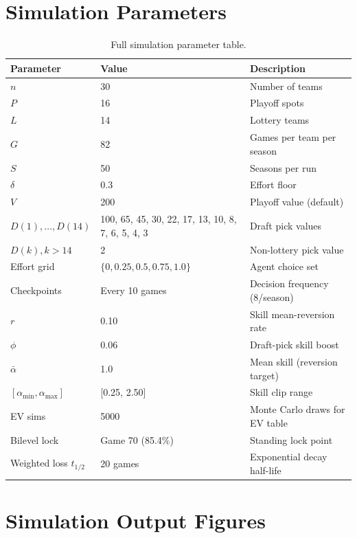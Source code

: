 \documentclass{article}
\begin{document}
\section{Simulation Parameters}
\label{app:params}

\begin{table}[h]
\centering
\renewcommand{\arraystretch}{1.25}
\begin{tabular}{lll}
\toprule
\textbf{Parameter} & \textbf{Value} & \textbf{Description} \\
\midrule
$n$ & 30 & Number of teams \\
$P$ & 16 & Playoff spots \\
$L$ & 14 & Lottery teams \\
$G$ & 82 & Games per team per season \\
$S$ & 50 & Seasons per run \\
$\delta$ & 0.3 & Effort floor \\
$V$ & 200 & Playoff value (default) \\
$D(1),\ldots,D(14)$ & 100, 65, 45, 30, 22, 17, 13, 10, 8, 7, 6, 5, 4, 3
    & Draft pick values \\
$D(k), k > 14$ & 2 & Non-lottery pick value \\
Effort grid & $\{0, 0.25, 0.5, 0.75, 1.0\}$ & Agent choice set \\
Checkpoints & Every 10 games & Decision frequency (8/season) \\
$r$ & 0.10 & Skill mean-reversion rate \\
$\phi$ & 0.06 & Draft-pick skill boost \\
$\bar\alpha$ & 1.0 & Mean skill (reversion target) \\
$[\alpha_{\min}, \alpha_{\max}]$ & [0.25, 2.50] & Skill clip range \\
EV sims & 5000 & Monte Carlo draws for EV table \\
Bilevel lock & Game 70 (85.4\%) & Standing lock point \\
Weighted loss $t_{1/2}$ & 20 games & Exponential decay half-life \\
\bottomrule
\end{tabular}
\caption{Full simulation parameter table.}
\label{tab:params}
\end{table}

\section{Simulation Output Figures}
\label{app:figures}
\end{document}
